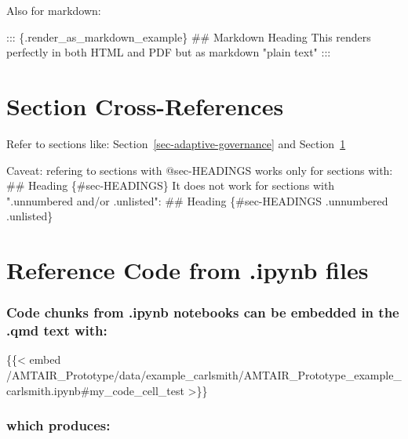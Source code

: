 \documentclass[
  11pt,
  letterpaper,
]{book}
\newenvironment{Shaded}{\begin{snugshade}}{\end{snugshade}}
\newcommand{\AnnotationTok}[1]{\textcolor[rgb]{0.37,0.37,0.37}{#1}}
\newcommand{\CommentTok}[1]{\textcolor[rgb]{0.37,0.37,0.37}{#1}}
\newcommand{\FunctionTok}[1]{\textcolor[rgb]{0.28,0.35,0.67}{#1}}
\newcommand{\NormalTok}[1]{\textcolor[rgb]{0.00,0.23,0.31}{#1}}
\begin{document}
Also for markdown:

\begin{Shaded}
\begin{Highlighting}[]
\NormalTok{::: \{.render\_as\_markdown\_example\}}
\FunctionTok{\#\# Markdown Heading}
\NormalTok{This renders perfectly in both HTML and PDF but as markdown "plain text"}
\NormalTok{:::}
\end{Highlighting}
\end{Shaded}

\section{Section Cross-References}\label{sec-crossref}

Refer to sections like: Section~\ref{sec-adaptive-governance} and
Section~\ref{sec-crossref}

\begin{Shaded}
\begin{Highlighting}[]
\AnnotationTok{Caveat:}\CommentTok{ refering to sections with @sec{-}HEADINGS works only for sections with:}
\FunctionTok{\#\# Heading \{\#sec{-}HEADINGS\}}
\NormalTok{It does not work for sections with ".unnumbered and/or .unlisted":}
\FunctionTok{\#\# Heading \{\#sec{-}HEADINGS .unnumbered .unlisted\}}
\end{Highlighting}
\end{Shaded}

\section{Reference Code from .ipynb
files}\label{reference-code-from-.ipynb-files}

\subsubsection{Code chunks from .ipynb notebooks can be embedded in the
.qmd text
with:}\label{code-chunks-from-.ipynb-notebooks-can-be-embedded-in-the-.qmd-text-with}

\begin{Shaded}
\begin{Highlighting}[]
\NormalTok{\{\{\textless{} embed /AMTAIR\_Prototype/data/example\_carlsmith/AMTAIR\_Prototype\_example\_carlsmith.ipynb\#my\_code\_cell\_test \textgreater{}\}\}}
\end{Highlighting}
\end{Shaded}

\subsubsection{which produces:}\label{which-produces}
\end{document}
